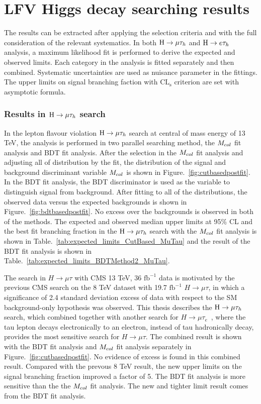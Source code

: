 \chapter{LFV Higgs decay searching results}

The results can be extracted after applying the selection criteria and with the full consideration of the relevant systematics.  In both $\mathrm{H}\to \mu\tau_{h}$ and $\mathrm{H} \to e \tau_{h}$ analysis, a maximum likelihood fit is performed to derive the expected and observed limits.  Each category in the analysis is fitted separately and then combined. Systematic uncertainties are used as nuisance parameter in the fittings.  The upper limits on signal branching faction with $\textrm{CL}_{\textrm{s}}$ criterion are set with asymptotic formula. 

\subsection{Results in $\mathrm{H}\to \mu\tau_{h}$ search}

In the lepton flavour violation $\mathrm{H}\to \mu\tau_{h}$ search at central of mass energy of 13 TeV, the analysis is performed in two parallel searching method, the $M_{col}$ fit analysis and BDT fit analysis. After the selection in the $M_{col}$ fit analysis and adjusting all of distribution by the fit,  the distribution of the signal and background discriminant variable $M_{col}$ is shown in Figure.~\ref{fig:cutbasedpostfit}. In the BDT fit analysis, the BDT discriminator is used as the variable to distinguish signal from background.  After fitting to all of the distributions, the observed data versus the expected backgrounds is shown in Figure.~\ref{fig:bdtbasedpostfit}. No excess over the backgrounds is observed in both of the methods. The expected and observed median upper limits at 95\% CL and the best fit branching fraction in the $\mathrm{H}\to \mu\tau_{h}$ search with the $M_{col}$ fit analysis is shown in Table.~\ref{tab:expected_limits_CutBased_MuTau}  and the result of the BDT fit analysis is shown in Table.~\ref{tab:expected_limits_BDTMethod2_MuTau}. 

The search in $H \to \mu \tau$ with CMS 13 TeV, 36 $\textrm{fb}^{-1}$ data is motivated by the previous CMS search on the 8 TeV dataset with 19.7 $\textrm{fb}^{-1}$ $H \to \mu \tau$, in which a significance of 2.4 standard deviation excess of data with respect to the SM background-only hypothesis was observed. This thesis describes the $\mathrm{H}\to \mu\tau_{h}$ search, which combined together with another search for $H \to \mu\tau_{e}$~\cite{paper:13TeVsearch}, where the tau lepton decays electronically to an electron, instead of tau hadronically decay, provides the most sensitive search for $H \to \mu \tau$. The combined result is shown with the BDT fit analysis and $M_{col}$ fit analysis separately in Figure.~\ref{fig:cutbasedpostfit}. No evidence of excess is found in this combined result. Compared with the prevous 8 TeV result, the new upper limits on the signal branching fraction improved a factor of 5. The BDT fit analysis is more sensitive than the the $M_{col}$ fit analysis. The new and tighter limit result comes from the BDT fit analysis.  



